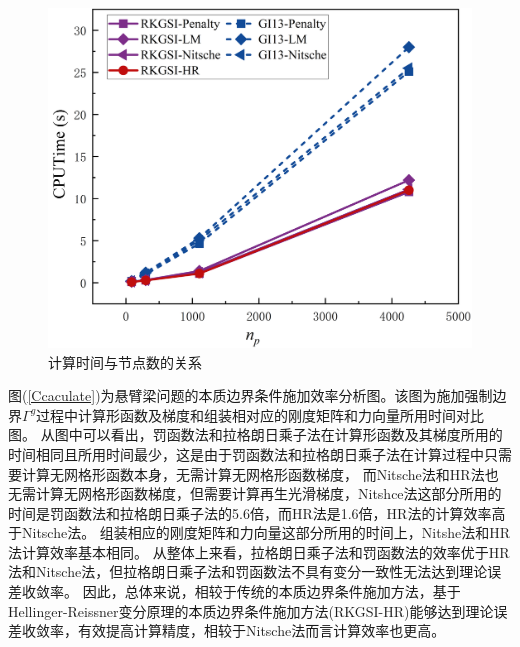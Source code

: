 \begin{figure}[!h]
    \centering
    \includegraphics[scale=0.5]{figure/cantilever/CPUTime.png}
    \caption{计算时间与节点数的关系}\label{CCPUTime}
\end{figure}\newpage
图(\ref{Ccaculate})为悬臂梁问题的本质边界条件施加效率分析图。该图为施加强制边界$\Gamma^g$过程中计算形函数及梯度和组装相对应的刚度矩阵和力向量所用时间对比图。
从图中可以看出，罚函数法和拉格朗日乘子法在计算形函数及其梯度所用的时间相同且所用时间最少，这是由于罚函数法和拉格朗日乘子法在计算过程中只需要计算无网格形函数本身，无需计算无网格形函数梯度，
而Nitsche法和HR法也无需计算无网格形函数梯度，但需要计算再生光滑梯度，Nitshce法这部分所用的时间是罚函数法和拉格朗日乘子法的5.6倍，而HR法是1.6倍，HR法的计算效率高于Nitsche法。
组装相应的刚度矩阵和力向量这部分所用的时间上，Nitshe法和HR法计算效率基本相同。
从整体上来看，拉格朗日乘子法和罚函数法的效率优于HR法和Nitsche法，但拉格朗日乘子法和罚函数法不具有变分一致性无法达到理论误差收敛率。
因此，总体来说，相较于传统的本质边界条件施加方法，基于Hellinger-Reissner变分原理的本质边界条件施加方法(RKGSI-HR)能够达到理论误差收敛率，有效提高计算精度，相较于Nitsche法而言计算效率也更高。
